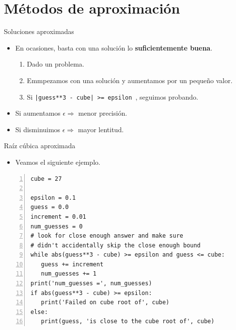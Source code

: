 \documentclass[mathserif]{beamer}
\begin{document}
\section{Métodos de aproximación}

\begin{frame}[fragile]{Soluciones aproximadas}
    \begin{itemize}
        \item En ocasiones, basta con una solución lo {\blue\bfseries suficientemente buena}. 
        
        \begin{enumerate}
            \item Dado un problema.
            \item Emmpezamos con una solución y aumentamos por un {\blue pequeño valor}.
            \item Si \lstinline&|guess**3 - cube| >= epsilon &, seguimos probando. 
        \end{enumerate}
        
        \item Si aumentamos $\epsilon \Rightarrow$ {\blue menor precisión}.
        \item Si disminuimos $\epsilon \Rightarrow$ {\blue mayor lentitud}.
    \end{itemize} 
\end{frame}

\begin{frame}[fragile]{Raíz cúbica aproximada}
    \begin{itemize}
        \item Veamos el siguiente ejemplo.
    \end{itemize}
\begin{lstlisting}[numbers=left]
cube = 27

epsilon = 0.1
guess = 0.0
increment = 0.01
num_guesses = 0
# look for close enough answer and make sure
# didn't accidentally skip the close enough bound
while abs(guess**3 - cube) >= epsilon and guess <= cube:
   guess += increment
   num_guesses += 1
print('num_guesses =', num_guesses)
if abs(guess**3 - cube) >= epsilon:
   print('Failed on cube root of', cube)
else:
   print(guess, 'is close to the cube root of', cube)
\end{lstlisting}
\end{frame}
\end{document}
